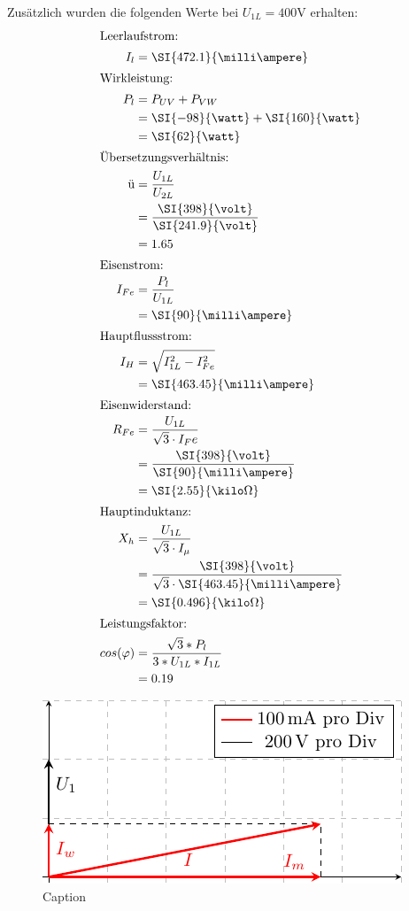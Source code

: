 Zusätzlich wurden die folgenden Werte bei  $U_{1L} = 400 \text{V}$ erhalten: \\
\begin{align*}
  \intertext{Leerlaufstrom: } I_{l} &=  \SI{472.1}{\milli\ampere}  \\  
  \intertext{Wirkleistung: }
 P_l &= P_{UV} + P_{VW}  \\
&=  \SI{-98}{\watt} + \SI{160}{\watt}\\
&=  \SI{62}{\watt}    \\
\intertext{Übersetzungsverhältnis:} \text{ü} &= \frac{U_{1L}}{U_{2L}} \\&= \frac{ \SI{398}{\volt}}{ \SI{241.9}{\volt} } \\
&= 1.65 \\
\intertext{Eisenstrom: } I_{Fe} &=
\frac{P_l}{U_{1L}} \\
&=  \SI{90}{\milli \ampere}  \\
\intertext{Hauptflussstrom: } I_{H} &=
\sqrt{I_{1L}^2-I_{Fe}^2} \\
&=  \SI{463.45}{\milli \ampere}\\
\intertext{Eisenwiderstand: } R_{Fe} &= \frac{U_{1L}}{\sqrt{3}\cdot I_Fe} \\
&= \frac{ \SI{398}{\volt}}{ \SI{90}{\milli\ampere} } \\
&= \SI{2.55}{\kilo\Omega}\\
\intertext{Hauptinduktanz: } X_{h} &= \frac{U_{1L}}{\sqrt{3} \cdot I_{\mu} } \\
&= \frac{ \SI{398}{\volt}}{ \sqrt{3}\cdot \SI{463.45}{\milli\ampere} } \\
&= \SI{0.496}{\kilo \Omega}  \\
\intertext{Leistungsfaktor: } cos(\varphi) &= \frac{\sqrt{3}*P_l}{3*U_{1L}*I_{1L}} \\
&=  0.19
\end{align*}

\begin{figure}[H]
    \centering
    \includegraphics{fig/phasor_open.pdf}
    \caption{Caption}
    \label{fig:open}
\end{figure}